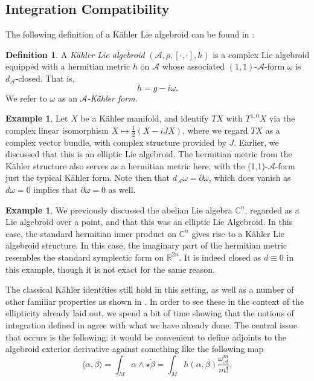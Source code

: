 \documentclass{amsart}
\newcommand{\p}{\partial}
\newcommand{\R}{\mathbb{R}}
\newcommand{\C}{\mathbb{C}}
\theoremstyle{definition}
\newtheorem{definition}[theorem]{Definition}
\newcommand{\A}{\mathcal{A}}
\theoremstyle{definition}
\newtheorem{exmp}[theorem]{Example}
\begin{document}
\subsection{Integration Compatibility} 
The following definition of a Kähler Lie algebroid can be found in \cite[Definition 2]{MR4722602}:
\begin{definition}
    A \textit{Kähler Lie algebroid} $(\A,\rho,[\cdot ,\cdot],h)$ is a complex Lie algebroid equipped with a hermitian metric $h$ on $\A$ whose associated $(1,1)$-$\A$-form $\omega$ is $d_\A$-closed. That is, 
    \begin{equation*}
        h= g-i\omega.
    \end{equation*} We refer to $\omega$ as an \textit{$\A$-Kähler form}.
\end{definition}
\begin{exmp} \label{TangentBundle}
   Let $X$ be a Kähler manifold, and identify $TX$ with $T^{1,0}X$ via the complex linear isomorphism $X \mapsto \frac{1}{2}(X-iJX)$, where we regard $TX$ as a complex vector bundle, with complex structure provided by $J$. Earlier, we discussed that this is an elliptic Lie algebroid. The hermitian metric from the Kähler structure also serves as a hermitian metric here, with the (1,1)-$\A$-form just the typical Kähler form. Note then that $d_\A \omega = \p \omega$, which does vanish as $d\omega=0$ implies that $\p \omega=0$ as well.
\end{exmp}
\begin{exmp}\label{LieAlgebra}
    We previously discussed the abelian Lie algebra $\C^n$, regarded as a Lie algebroid over a point, and that this was an elliptic Lie Algebroid.
   In this case, the standard hermitian inner product on $\C^n$ gives rise to a Kähler Lie algebroid structure. In this case, the imaginary part of the hermitian metric resembles the standard symplectic form on $\R^{2n}$. It is indeed closed as $d \equiv 0$ in this example, though it is not exact for the same reason. 
\end{exmp}
The classical Kähler identities still hold in this setting, as well as a number of other familiar properties as shown in \cite{MR4722602}. In order to see these in the context of the ellipticity already laid out, we spend a bit of time showing that the notions of integration defined in \cite{MR4722602} agree with what we have already done. The central issue that occurs is the following: it would be convenient to define adjoints to the algebroid exterior derivative against something like the following map
 \begin{equation*}
     \langle \alpha, \beta \rangle = \int_M \alpha \wedge \overline{\star \beta} = \int_M h(\alpha,\beta) \frac
     {\omega_\A^m}{m!},
 \end{equation*}
\end{document}

